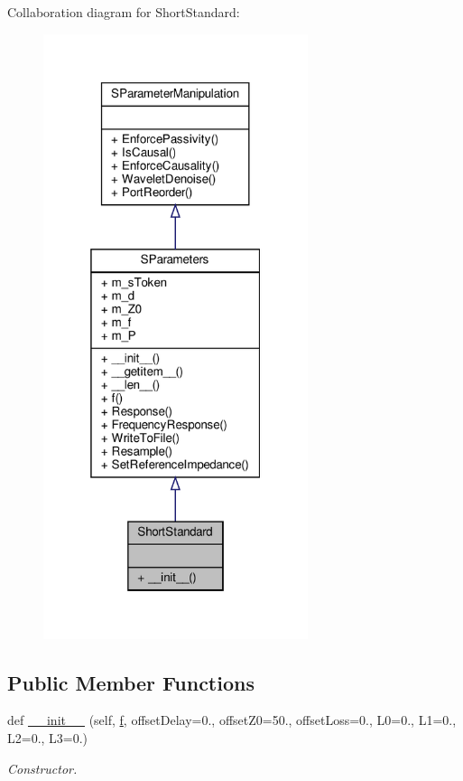 Collaboration diagram for Short\+Standard\+:\nopagebreak
\begin{figure}[H]
\begin{center}
\leavevmode
\includegraphics[width=220pt]{classSignalIntegrity_1_1Measurement_1_1CalKit_1_1Standards_1_1ShortStandard_1_1ShortStandard__coll__graph}
\end{center}
\end{figure}
\subsection*{Public Member Functions}
\begin{DoxyCompactItemize}
\item 
def \hyperlink{classSignalIntegrity_1_1Measurement_1_1CalKit_1_1Standards_1_1ShortStandard_1_1ShortStandard_a18ad2ab7b5864b09d3eb97b6dcddd8dd}{\+\_\+\+\_\+init\+\_\+\+\_\+} (self, \hyperlink{classSignalIntegrity_1_1SParameters_1_1SParameters_1_1SParameters_a32e7a34d6837fe949b413c852a0447f8}{f}, offset\+Delay=0., offset\+Z0=50., offset\+Loss=0., L0=0., L1=0., L2=0., L3=0.)
\begin{DoxyCompactList}\small\item\em Constructor. \end{DoxyCompactList}\end{DoxyCompactItemize}


